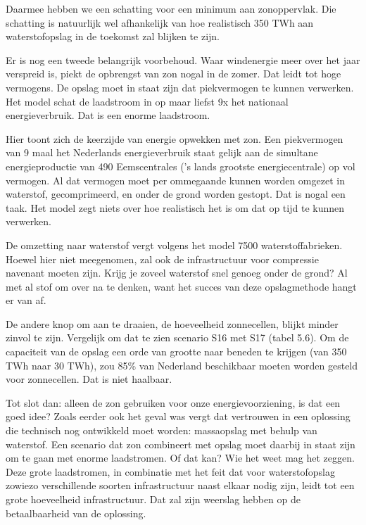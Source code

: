 \documentclass[
  11pt,
  a4paper,
]{book}
\begin{document}
Daarmee hebben we een schatting voor een minimum aan zonoppervlak. Die schatting is natuurlijk wel afhankelijk van hoe realistisch 350 TWh aan waterstofopslag in de toekomst zal blijken te zijn.

Er is nog een tweede belangrijk voorbehoud. Waar windenergie meer over het jaar verspreid is, piekt de opbrengst van zon nogal in de zomer. Dat leidt tot hoge vermogens. De opslag moet in staat zijn dat piekvermogen te kunnen verwerken. Het model schat de laadstroom in op maar liefst 9x het nationaal energieverbruik. Dat is een enorme laadstroom.

Hier toont zich de keerzijde van energie opwekken met zon. Een piekvermogen van 9 maal het Nederlands energieverbruik staat gelijk aan de simultane energieproductie van 490 Eemscentrales ('s lands grootste energiecentrale) op vol vermogen. Al dat vermogen moet per ommegaande kunnen worden omgezet in waterstof, gecomprimeerd, en onder de grond worden gestopt. Dat is nogal een taak. Het model zegt niets over hoe realistisch het is om dat op tijd te kunnen verwerken.

De omzetting naar waterstof vergt volgens het model 7500 waterstoffabrieken. Hoewel hier niet meegenomen, zal ook de infrastructuur voor compressie navenant moeten zijn. Krijg je zoveel waterstof snel genoeg onder de grond? Al met al stof om over na te denken, want het succes van deze opslagmethode hangt er van af.

\bigskip\noindent
De andere knop om aan te draaien, de hoeveelheid zonnecellen, blijkt minder zinvol te zijn. Vergelijk om dat te zien scenario S16 met S17 (tabel 5.6). Om de capaciteit van de opslag een orde van grootte naar beneden te krijgen (van 350 TWh naar 30 TWh), zou 85\% van Nederland beschikbaar moeten worden gesteld voor zonnecellen. Dat is niet haalbaar.

\bigskip

Tot slot dan: alleen de zon gebruiken voor onze energievoorziening, is dat een goed idee? Zoals eerder ook het geval was vergt dat vertrouwen in een oplossing die technisch nog ontwikkeld moet worden: massaopslag met behulp van waterstof. Een scenario dat zon combineert met opslag moet daarbij in staat zijn om te gaan met enorme laadstromen. Of dat kan? Wie het weet mag het zeggen. Deze grote laadstromen, in combinatie met het feit dat voor waterstofopslag zowiezo verschillende soorten infrastructuur naast elkaar nodig zijn, leidt tot een grote hoeveelheid infrastructuur. Dat zal zijn weerslag hebben op de betaalbaarheid van de oplossing.
\end{document}
